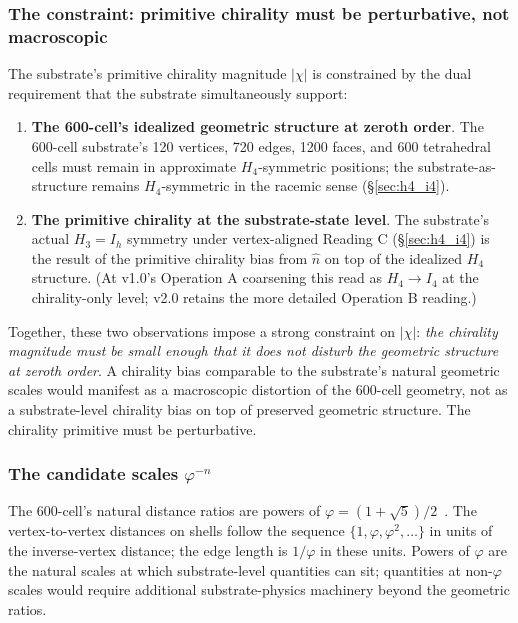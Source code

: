 \documentclass[11pt,letterpaper]{article}
\newcommand{\phig}{\varphi}
\newcommand{\Hfour}{H_4}
\newcommand{\Ifour}{I_4}
\begin{document}
\subsubsection{The constraint: primitive chirality must be perturbative, not macroscopic}\label{sec:chi_constraint}

The substrate's primitive chirality magnitude $|\chi|$ is constrained by the dual requirement that the substrate simultaneously support:

\begin{enumerate}\setlength\itemsep{0.2em}
    \item \textbf{The 600-cell's idealized geometric structure at zeroth order}. The 600-cell substrate's 120 vertices, 720 edges, 1200 faces, and 600 tetrahedral cells must remain in approximate $\Hfour$-symmetric positions; the substrate-as-structure remains $\Hfour$-symmetric in the racemic sense (\S\ref{sec:h4_i4}).
    \item \textbf{The primitive chirality at the substrate-state level}. The substrate's actual $H_3 = I_h$ symmetry under vertex-aligned Reading C (\S\ref{sec:h4_i4}) is the result of the primitive chirality bias from $\hat{n}$ on top of the idealized $\Hfour$ structure. (At v1.0's Operation A coarsening this read as $\Hfour \to \Ifour$ at the chirality-only level; v2.0 retains the more detailed Operation B reading.)
\end{enumerate}

Together, these two observations impose a strong constraint on $|\chi|$: \emph{the chirality magnitude must be small enough that it does not disturb the geometric structure at zeroth order}. A chirality bias comparable to the substrate's natural geometric scales would manifest as a macroscopic distortion of the 600-cell geometry, not as a substrate-level chirality bias on top of preserved geometric structure. The chirality primitive must be perturbative.

\subsubsection{The candidate scales $\phig^{-n}$}\label{sec:chi_scales}

The 600-cell's natural distance ratios are powers of $\phig = (1+\sqrt{5})/2$~\cite{coxeter_1973}. The vertex-to-vertex distances on shells follow the sequence $\{1, \phig, \phig^2, \ldots\}$ in units of the inverse-vertex distance; the edge length is $1/\phig$ in these units. Powers of $\phig$ are the natural scales at which substrate-level quantities can sit; quantities at non-$\phig$ scales would require additional substrate-physics machinery beyond the geometric ratios.
\end{document}
